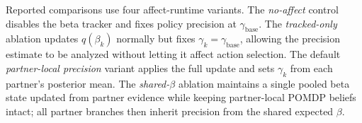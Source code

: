 Reported comparisons use four affect-runtime variants. The \emph{no-affect} control disables the beta tracker and fixes policy precision at $\gamma_{\mathrm{base}}$. The \emph{tracked-only} ablation updates $q(\beta_k)$ normally but fixes $\gamma_k = \gamma_{\mathrm{base}}$, allowing the precision estimate to be analyzed without letting it affect action selection. The default \emph{partner-local precision} variant applies the full update and sets $\gamma_k$ from each partner's posterior mean. The \emph{shared-$\beta$} ablation maintains a single pooled beta state updated from partner evidence while keeping partner-local POMDP beliefs intact; all partner branches then inherit precision from the shared expected $\beta$.
